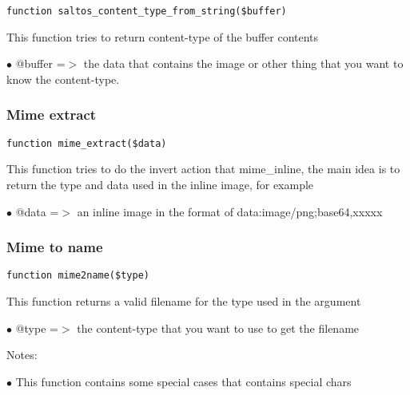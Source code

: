 \documentclass[a4paper]{article}
\begin{document}
\begin{lstlisting}
function saltos_content_type_from_string($buffer)
\end{lstlisting}

This function tries to return content-type of the buffer contents

\begin{compactitem}
\item[\color{myblue}$\bullet$] @buffer =$>$ the data that contains the image or other thing that you want to know
           the content-type.
\end{compactitem}

\hypertarget{toc180}{}
\subsubsection{Mime extract}

\begin{lstlisting}
function mime_extract($data)
\end{lstlisting}

This function tries to do the invert action that mime\_inline, the main idea
is to return the type and data used in the inline image, for example

\begin{compactitem}
\item[\color{myblue}$\bullet$] @data =$>$ an inline image in the format of data:image/png;base64,xxxxx
\end{compactitem}

\hypertarget{toc181}{}
\subsubsection{Mime to name}

\begin{lstlisting}
function mime2name($type)
\end{lstlisting}

This function returns a valid filename for the type used in the argument

\begin{compactitem}
\item[\color{myblue}$\bullet$] @type =$>$ the content-type that you want to use to get the filename
\end{compactitem}

Notes:

\begin{compactitem}
\item[\color{myblue}$\bullet$] This function contains some special cases that contains special chars
\end{compactitem}
\end{document}
